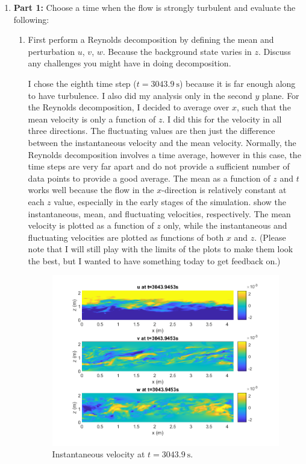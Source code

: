\documentclass[11pt]{article}
\begin{document}
	
	\begin{enumerate}
		\item \textbf{Part 1:} Choose a time when the flow is strongly turbulent and evaluate the following:
		\begin{enumerate}
			\item First perform a Reynolds decomposition by defining the mean and perturbation $u$, $v$, $w$. Because the background state varies in $z$. Discuss any challenges you might have in doing decomposition.\par
			
			I chose the eighth time step ($t=\SI{3043.9}{\second}$) because it is far enough along to have turbulence. I also did my analysis only in the second $y$ plane. For the Reynolds decomposition, I decided to average over $x$, such that the mean velocity is only a function of $z$. I did this for the velocity in all three directions. The fluctuating values are then just the difference between the instantaneous velocity and the mean velocity. Normally, the Reynolds decomposition involves a time average, however in this case, the time steps are very far apart and do not provide a sufficient number of data points to provide a good average. The mean as a function of $z$ and $t$ works well because the flow in the $x$-direction is relatively constant at each $z$ value, especially in the early stages of the simulation.  show the instantaneous, mean, and fluctuating velocities, respectively. The mean velocity is plotted as a function of $z$ only, while the instantaneous and fluctuating velocities are plotted as functions of both $x$ and $z$. (Please note that I will still play with the limits of the plots to make them look the best, but I wanted to have something today to get feedback on.)
			
			
			\begin{figure}[htbp]
				\centering
				\includegraphics[width=\textwidth]{1-plots/Vel_plot_3043.png}
				\caption{Instantaneous velocity at $t=\SI{3043.9}{\second}$.}
				\label{fig:Vel 3043}
			\end{figure}
		

\end{enumerate}
\end{enumerate}
\end{document}
